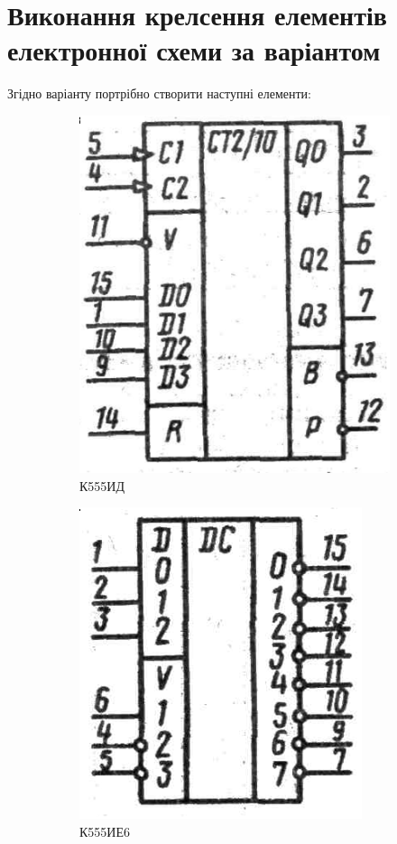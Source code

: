\section{Виконання крелсення елементів електронної схеми за варіантом}

Згідно варіанту портрібно створити наступні елементи:
\begin{figure}[!htb]
  \begin{subfigure}[b]{.4\linewidth}
    \centering \includegraphics[width=.8\linewidth]{./images/lab2/target_element1.png}
    \caption{К555ИД}
    \label{fig:lab2:target_element1}
  \end{subfigure}
  \hfill
  \begin{subfigure}[b]{.4\linewidth}
    \centering \includegraphics[width=.8\linewidth]{./images/lab2/target_element2.png}
    \caption{К555ИЕ6}
    \label{fig:lab2:target_element2}
  \end{subfigure}
  \caption{\label{fig:lab2:target_elements}}
\end{figure}
\FloatBarrier

